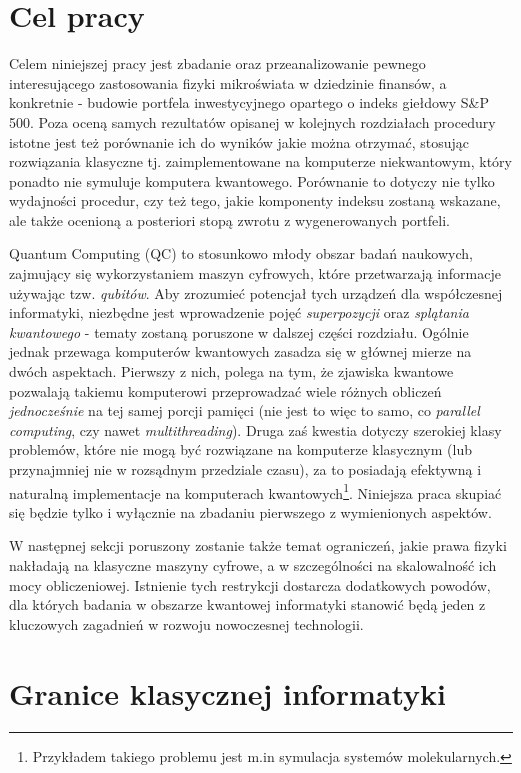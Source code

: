 \documentclass[12pt,a4paper,twoside,openany]{book}
\begin{document}
\section{Cel pracy}
Celem niniejszej pracy jest zbadanie oraz przeanalizowanie pewnego interesującego zastosowania fizyki mikroświata w dziedzinie finansów, a konkretnie - budowie portfela inwestycyjnego opartego o indeks giełdowy S\&P 500. Poza oceną samych rezultatów opisanej w kolejnych rozdziałach procedury istotne jest też porównanie ich do wyników jakie można otrzymać, stosując rozwiązania klasyczne tj. zaimplementowane na komputerze niekwantowym, który ponadto nie symuluje komputera kwantowego. Porównanie to dotyczy nie tylko wydajności procedur, czy też tego, jakie komponenty indeksu zostaną wskazane, ale także ocenioną a posteriori stopą zwrotu z wygenerowanych portfeli.

Quantum Computing (QC) to stosunkowo młody obszar badań naukowych, zajmujący się wykorzystaniem maszyn cyfrowych, które przetwarzają informacje używając tzw. \textit{qubitów}. Aby zrozumieć potencjał tych urządzeń dla współczesnej informatyki, niezbędne jest wprowadzenie pojęć \textit{superpozycji} oraz \textit{splątania kwantowego} - tematy zostaną poruszone w dalszej części rozdziału. Ogólnie jednak przewaga komputerów kwantowych zasadza się w głównej mierze na dwóch aspektach. Pierwszy z nich, polega na tym, że zjawiska kwantowe pozwalają takiemu komputerowi przeprowadzać wiele różnych obliczeń \textit{jednocześnie} na tej samej porcji pamięci (nie jest to więc to samo, co \textit{parallel computing}, czy nawet \textit{multithreading}). Druga zaś kwestia dotyczy szerokiej klasy problemów, które nie mogą być rozwiązane na komputerze klasycznym (lub przynajmniej nie w rozsądnym przedziale czasu), za to posiadają efektywną i naturalną implementacje na komputerach kwantowych\footnote{Przykładem takiego problemu jest m.in symulacja systemów molekularnych.}. Niniejsza praca skupiać się będzie tylko i wyłącznie na zbadaniu pierwszego z wymienionych aspektów.

W następnej sekcji poruszony zostanie także temat ograniczeń, jakie prawa fizyki nakładają na klasyczne maszyny cyfrowe, a w szczególności na skalowalność ich mocy obliczeniowej. Istnienie tych restrykcji dostarcza dodatkowych powodów, dla których badania w obszarze kwantowej informatyki stanowić będą jeden z kluczowych zagadnień w rozwoju nowoczesnej technologii.



\section{Granice klasycznej informatyki}
\end{document}
